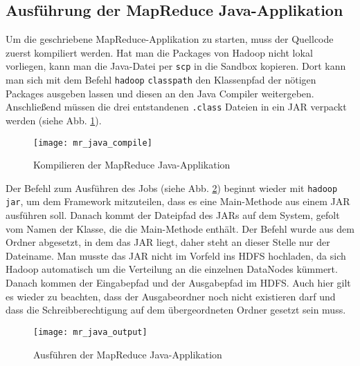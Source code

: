 

\subsection{Ausführung der MapReduce Java-Applikation}
Um die geschriebene MapReduce-Applikation zu starten, muss der Quellcode zuerst kompiliert werden. Hat man die Packages von Hadoop nicht lokal vorliegen, kann man die Java-Datei per \verb|scp| in die Sandbox kopieren. Dort kann man sich mit dem Befehl \verb|hadoop| \verb|classpath| den Klassenpfad der nötigen Packages ausgeben lassen und diesen an den Java Compiler weitergeben. Anschließend müssen die drei entstandenen \verb|.class| Dateien in ein JAR verpackt werden (siehe Abb. \ref{fig:mr java api compile}). 

\begin{figure}[ht]
    \centering
    \texttt{[image: mr\_java\_compile]}
    \caption[Kompilieren der MapReduce Java-Applikation]{Kompilieren der MapReduce Java-Applikation}
    \label{fig:mr java api compile}
\end{figure}

Der Befehl zum Ausführen des Jobs (siehe Abb. \ref{fig:mr java api command}) beginnt wieder mit \verb|hadoop jar|, um dem Framework mitzuteilen, dass es eine Main-Methode aus einem JAR ausführen soll. Danach kommt der Dateipfad des JARs auf dem System, gefolt vom Namen der Klasse, die die Main-Methode enthält. Der Befehl wurde aus dem Ordner abgesetzt, in dem das JAR liegt, daher steht an dieser Stelle nur der Dateiname. Man musste das JAR nicht im Vorfeld ins HDFS hochladen, da sich Hadoop automatisch um die Verteilung an die einzelnen DataNodes kümmert. Danach kommen der Eingabepfad und der Ausgabepfad im HDFS. Auch hier gilt es wieder zu beachten, dass der Ausgabeordner noch nicht existieren darf und dass die Schreibberechtigung auf dem übergeordneten Ordner gesetzt sein muss. 

\begin{figure}[ht]
    \centering
    \texttt{[image: mr\_java\_output]}
    \caption[Ausführen der MapReduce Java-Applikation]{Ausführen der MapReduce Java-Applikation}
    \label{fig:mr java api command}
\end{figure}

